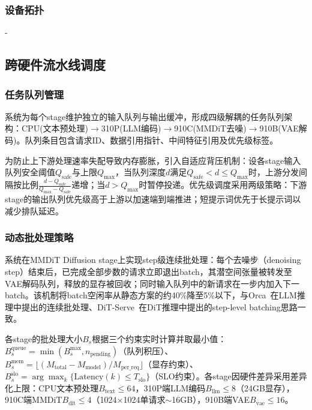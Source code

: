 \documentclass{ctexart}
\begin{document}
\subsubsection{设备拓扑}
-
\subsection{跨硬件流水线调度}

\subsubsection{任务队列管理}

系统为每个stage维护独立的输入队列与输出缓冲，形成四级解耦的任务队列架构：CPU(文本预处理)$\rightarrow$310P(LLM编码)$\rightarrow$910C(MMDiT去噪)$\rightarrow$910B(VAE解码)。队列条目包含请求ID、数据引用指针、中间特征引用及优先级标签。

为防止上下游处理速率失配导致内存膨胀，引入自适应背压机制：设各stage输入队列安全阈值$Q_{\text{safe}}$与上限$Q_{\text{max}}$，当队列深度$d$满足$Q_{\text{safe}}<d\le Q_{\text{max}}$时，上游分发间隔按比例$\frac{d-Q_{\text{safe}}}{Q_{\text{max}}-Q_{\text{safe}}}$递增；当$d>Q_{\text{max}}$时暂停投递。优先级调度采用两级策略：下游stage的输出队列优先级高于上游以加速端到端推进；短提示词优先于长提示词以减少排队延迟。

\subsubsection{动态批处理策略}

系统在MMDiT Diffusion stage上实现step级连续批处理：每个去噪步（denoising step）结束后，已完成全部步数的请求立即退出batch，其潜空间张量被转发至VAE解码队列，释放的显存被回收；同时输入队列中的新请求在一步内加入下一batch。该机制将batch空闲率从静态方案的约40\%降至5\%以下，与Orca~\cite{OrcaDistributedServingYu2022}在LLM推理中提出的连续批处理、DiT-Serve~\cite{DiTServeEfficientServingLuo2025}在DiT推理中提出的step-level batching思路一致。

各stage的批处理大小$B_s$根据三个约束实时计算并取最小值：$B_s^{\text{queue}}=\min(B_s^{\text{max}}, n_{\text{pending}})$（队列积压）、$B_s^{\text{mem}}=\lfloor (M_{\text{total}}-M_{\text{model}})/M_{\text{per\_req}} \rfloor$（显存约束）、$B_s^{\text{slo}}=\arg\max_k\{\text{Latency}(k)\le T_{\text{slo}}\}$（SLO约束）。各stage因硬件差异采用差异化上限：CPU文本预处理$B_{\text{text}}\le64$，310P端LLM编码$B_{\text{llm}}\le8$（24GB显存），910C端MMDiT$B_{\text{dit}}\le4$（1024$\times$1024单请求$\sim$16GB），910B端VAE$B_{\text{vae}}\le16$。
\end{document}
